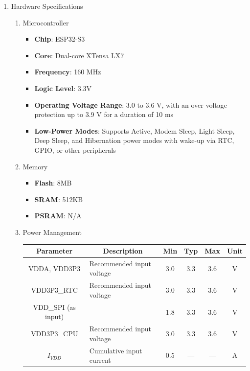 \documentclass[conference]{IEEEtran}
\begin{document}
\begin{enumerate}[label=\arabic*.]
\item Hardware Specifications\\
\begin{enumerate}[label=\alph*.]
\item Microcontroller\\
\begin{itemize}
\item \textbf{Chip}: ESP32-S3\\
\item \textbf{Core}: Dual-core XTensa LX7\\
\item \textbf{Frequency}: 160 MHz\\
\item \textbf{Logic Level}: 3.3V\\
\item \textbf{Operating Voltage Range}: 3.0 to 3.6 V, with an over voltage protection up to 3.9 V for a duration of 10 ms\\
\item \textbf{Low-Power Modes}: Supports Active, Modem Sleep, Light Sleep, Deep Sleep, and Hibernation power modes with wake-up via RTC, GPIO, or other peripherals\\
\end{itemize}

\item Memory\\
\begin{itemize}
\item \textbf{Flash}: 8MB\\
\item \textbf{SRAM}: 512KB\\
\item \textbf{PSRAM}: N/A\\
\end{itemize}

\item Power Management
\begin{table}[ht]
\setlength{\extrarowheight}{2.5pt}
\centering
\begin{tabular}{|c|l|c|c|c|c|}
\hline
\textbf{Parameter} & \multicolumn{1}{c|}{\textbf{Description}} & \textbf{Min} & \textbf{Typ} & \textbf{Max} & \textbf{Unit} \\ \hline
VDDA, VDD3P3 & Recommended input voltage & 3.0 & 3.3 & 3.6 & V \\ \hline
VDD3P3\_RTC & Recommended input voltage & 3.0 & 3.3 & 3.6 & V \\ \hline
VDD\_SPI (as input) & --- & 1.8 & 3.3 & 3.6 & V \\ \hline
VDD3P3\_CPU & Recommended input voltage & 3.0 & 3.3 & 3.6 & V \\ \hline
\(I_{VDD}\) & Cumulative input current & 0.5 & --- & --- & A \\ \hline
\end{tabular}
\end{table}


\end{enumerate}
\end{enumerate}
\end{document}
